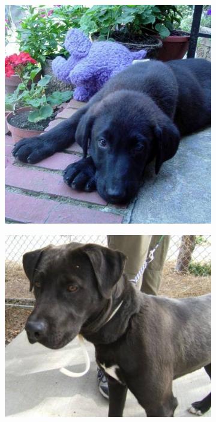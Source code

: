 \begin{figure}
\begin{subfigure}[b]{.2\linewidth}
\includegraphics[width=\linewidth]{Figs/dog876.jpg}
\end{subfigure}
\begin{subfigure}[b]{.2\linewidth}
\includegraphics[width=\linewidth]{Figs/dog508.jpg}

\end{subfigure}
\end{figure}
